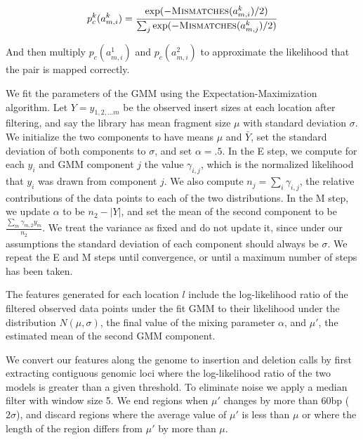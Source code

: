 \documentclass [11pt] {report}
\begin{document}
\begin{description}
\[ p^{k}_c(a^{k}_{m,i}) = \frac{\exp({-\textsc{Mismatches}(a^{k}_{m,i})/2)}}{\sum_j{\exp(-\textsc{Mismatches}(a^{k}_{m,j})/2)}} \]

And then multiply $p_c(a^{1}_{m,i})$ and $p_c(a^{2}_{m,i})$ to approximate the likelihood that the pair is mapped correctly.

We fit the parameters of the GMM using the Expectation-Maximization algorithm. Let $Y = y_{1,2, \ldots m}$ be the observed insert sizes at each location after filtering, and say the library has mean fragment size $\mu$ with standard deviation $\sigma$. We initialize the two components to have means $\mu$ and $\bar{Y}$, set the standard deviation of both components to $\sigma$, and set $\alpha = .5$. In the E step, we compute for each $y_i$ and GMM component $j$ the value $\gamma_{i,j}$, which is the normalized likelihood that $y_i$ was drawn from component $j$. We also compute $n_j = \sum_i{\gamma_{i,j}}$, the relative contributions of the data points to each of the two distributions. In the M step, we update $\alpha$ to be $n_2 - \left|Y\right|$, and set the mean of the second component to be $\frac{\sum_m{\gamma_{m,2}y_m}}{n_2}$. We treat the variance as fixed and do not update it, since under our assumptions the standard deviation of each component should always be $\sigma$. We repeat the E and M steps until convergence, or until a maximum number of steps has been taken.

The features generated for each location $l$ include the log-likelihood ratio of the filtered observed data points under the fit GMM to their likelihood under the distribution $N(\mu,\sigma)$, the final value of the mixing parameter $\alpha$, and $\mu'$, the estimated mean of the second GMM component.

\item[\sc{PostProcess}] We convert our features along the genome to insertion and deletion calls by first extracting contiguous genomic loci where the log-likelihood ratio of the two models is greater than a given threshold. To eliminate noise we apply a median filter with window size 5. We end regions when $\mu'$ changes by more than 60bp ($2\sigma$), and discard regions where the average value of $\mu'$ is less than $\mu$ or where the length of the region differs from $\mu'$ by more than $\mu$.
\end{description}

% 


% 
% 
% 
\end{document}
